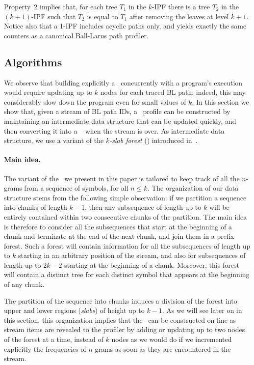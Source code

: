 Property~2 implies that, for each tree $T_1$ in the $k$-IPF there is a tree $T_2$ in the $(k+1)$-IPF such that $T_2$ is equal to $T_1$ after removing the leaves at level $k+1$.
Notice also that a 1-IPF includes acyclic paths only, and yields exactly the same counters as a canonical Ball-Larus path profiler. %


\subsection{Algorithms}
\label{ss:kblp-algorithms}

We observe that building explicitly a \kipf\ concurrently with a program's execution would require updating up to $k$ nodes for each traced BL path: indeed, this may considerably slow down the program even for small values of $k$. In this section we show that, given a stream of BL path IDs, a \kipf\ profile can be constructed by maintaining an intermediate data structure that can be updated quickly, and then converting it into a \kipf\
when the stream is over. As intermediate data structure, we use a variant of the {\em $k$-slab forest} (\ksf) introduced in~\cite{Ausiello12}.

\paragraph*{Main idea.} The variant of the \ksf\ we present in this paper is tailored to keep track of all the $n$-grams from a sequence of symbols, for all $n\le k$. The organization of our data structure stems from the following simple observation: if we partition a sequence into chunks of length $k-1$, then any subsequence of length up to $k$ will be entirely contained within two consecutive chunks of the partition. The main idea is therefore to consider all the subsequences that start at the beginning of a chunk and terminate at the end of the next chunk, and join them in a prefix forest. Such a forest will contain information for all the subsequences of length up to $k$ starting in an arbitrary position of the stream, and also for subsequences of length up to $2k-2$ starting at the beginning of a chunk. Moreover, this forest will contain a distinct tree for each distinct symbol that appears at the beginning of any chunk.

The partition of the sequence into chunks induces a division of the forest into upper and lower regions ({\em slabs}) of height up to $k-1$. As we will see later on in this section, this organization implies that the \ksf\ can be constructed on-line as stream items are revealed to the profiler by adding or updating up to two nodes of the forest at a time, instead of $k$ nodes as we would do if we incremented explicitly the frequencies of $n$-grams as soon as they are encountered in the stream.

